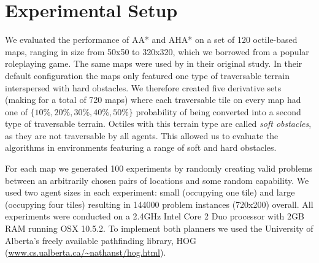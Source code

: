 \section{Experimental Setup}
We evaluated the performance of AA* and AHA* on a set of 120 octile-based maps, ranging in size from 50x50 to 320x320, which we borrowed from a popular roleplaying game.
The same maps were used by \cite{botea04} in their original study.
In their default configuration the maps only featured one type of traversable terrain interspersed with hard obstacles. 
We therefore created five derivative sets (making for a total of 720 maps) where each traversable tile on every map had one of $\lbrace 10\%, 20\%, 30\%, 40\%, 50\% \rbrace$ probability of being converted into a second type of traversable terrain. Octiles with this terrain type are called \emph{soft obstacles}, as they are not traversable by all agents.
This allowed us to evaluate the algorithms in environments featuring a range of soft and hard obstacles.
\par \indent
For each map we generated 100 experiments by randomly creating valid problems between an arbitrarily chosen pairs of locations and some random capability.
We used two agent sizes in each experiment: small (occupying one tile) and large (occupying four tiles) resulting in 144000 problem instances (720x200) overall.
All experiments were conducted on a 2.4GHz Intel Core 2 Duo processor with 2GB RAM running OSX 10.5.2.
To implement both planners we used the University of Alberta's freely available pathfinding library, HOG (\url{www.cs.ualberta.ca/~nathanst/hog.html}). 
